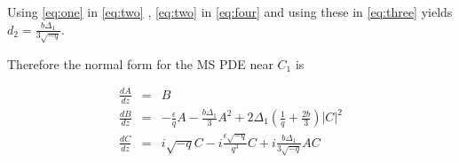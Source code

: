 Using \eqref{eq:one} in \eqref{eq:two} , \eqref{eq:two} in \eqref{eq:four} and using these in \eqref{eq:three} yields $ d_2 = \frac{ b \Delta_1 }{ 3 \sqrt{-q} } $.

Therefore the normal form for the MS PDE near $C_1$ is 

\begin{subequations}
\begin{eqnarray}
\frac{dA}{dz} &=& B \\ \label{eq:normalA}
\frac{dB}{dz} &=& -\frac{\epsilon}{q} A - \frac{b \Delta_1 }{3} A^2 + 2 \Delta_1 \left(\frac{1}{q} + \frac{2 b }{3} \right) \left|C\right|^2 \\ \label{eq:normalB}
\frac{dC}{dz} &=& i \sqrt{-q} C - i \frac{\epsilon \sqrt{-q} }{q^3} C + i \frac{b \Delta_1}{3 \sqrt{-q}} A C \label{eq:normalC}
\end{eqnarray}
\end{subequations}


